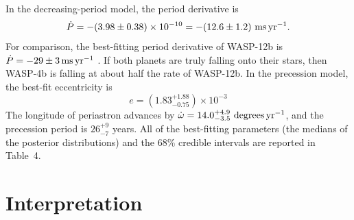 \documentclass[12pt,twocolumn,tighten]{aastex62}
\begin{document}
In the decreasing-period model, the period derivative is
\begin{equation}
\dot{P}
  = - (3.98 \pm 0.38)\times 10^{-10}
  = - (12.6 \pm 1.2)~{\rm ms}\,{\rm yr}^{-1}.
  \label{eq:dP_dt_obs}
\end{equation}
For comparison, the best-fitting period derivative of WASP-12b is
$\dot{P} = -29 \pm 3\,{\rm ms}\,{\rm yr}^{-1}$
\citep{maciejewski_departure_2016,patra_2017}.  If both planets are
truly falling onto their stars, then WASP-4b is falling at about half
the rate of WASP-12b.  In the precession model, the best-fit
eccentricity is
\begin{equation}
  e = (1.83^{+ 1.88}_{- 0.75})\times10^{-3}
\end{equation}
The longitude of periastron advances by $\dot{\omega} =
14.0^{+4.9}_{-3.5}\ {\rm degrees}\,{\rm yr}^{-1}$, and the precession
period is $26^{+9}_{-7}$ years.  All of the best-fitting parameters
(the medians of the posterior distributions) and the 68\% credible
intervals are reported in Table~4.

\section{Interpretation}
\label{sec:implications}
\end{document}
